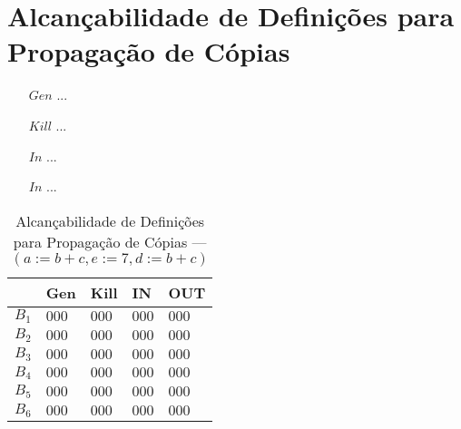 \section{Alcan\c{c}abilidade de Defini\c{c}\~oes para Propaga\c{c}\~ao de C\'opias}

\begin{itemize}
  \item[$Gen$] ...
  \item[$Kill$] ...
  \item[$In$] ...
  \item[$In$] ...
\end{itemize}

\begin{table}[ht]
\centering
\begin{tabular}{l|l|l|l|l}
	& Gen & Kill & IN & OUT\\
\hline
$B_{1}$ &  $000$ & $000$ & $000$ & $000$\\
$B_{2}$ &  $000$ & $000$ & $000$ & $000$\\
$B_{3}$ &  $000$ & $000$ & $000$ & $000$\\
$B_{4}$ &  $000$ & $000$ & $000$ & $000$\\
$B_{5}$ &  $000$ & $000$ & $000$ & $000$\\
$B_{6}$ &  $000$ & $000$ & $000$ & $000$\\
\end{tabular}
\caption{Alcan\c{c}abilidade de Defini\c{c}\~oes para Propaga\c{c}\~ao de C\'opias --- $(a:=b+c, e:=7, d:=b+c)$}
\end{table}


